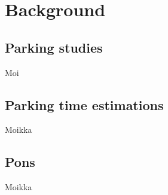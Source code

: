 \section{Background}

\subsection{Parking studies}
\justify
Moi

\subsection{Parking time estimations}
\justify
Moikka

\subsection{Pons}
\justify
Moikka